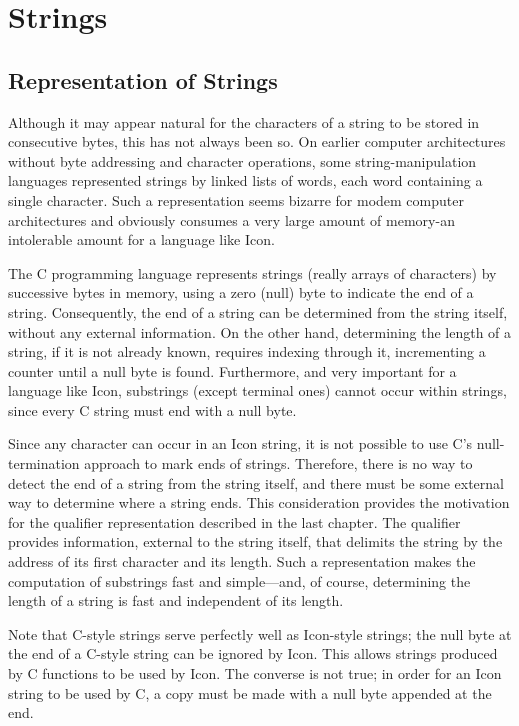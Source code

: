 \section{Strings}
\subsection{Representation of Strings}

Although it may appear natural for the characters of a string to be
stored in consecutive bytes, this has not always been so. On earlier
computer architectures without byte addressing and character
operations, some string-manipulation languages represented strings by
linked lists of words, each word containing a single character. Such a
representation seems bizarre for modem computer architectures and
obviously consumes a very large amount of memory-an intolerable amount
for a language like Icon.

The C programming language represents strings (really arrays of
characters) by successive bytes in memory, using a zero (null) byte to
indicate the end of a string. Consequently, the end of a string can be
determined from the string itself, without any external
information. On the other hand, determining the length of a string, if
it is not already known, requires indexing through it, incrementing a
counter until a null byte is found. Furthermore, and very important
for a language like Icon, substrings (except terminal ones) cannot
occur within strings, since every C string must end with a null byte.

Since any character can occur in an Icon string, it is not possible to
use C's null-termination approach to mark ends of strings. Therefore,
there is no way to detect the end of a string from the string itself,
and there must be some external way to determine where a string
ends. This consideration provides the motivation for the qualifier
representation described in the last chapter. The qualifier provides
information, external to the string itself, that delimits the string
by the address of its first character and its length. Such a
representation makes the computation of substrings fast and
simple---and, of course, determining the length of a string is
fast and independent of its length.

Note that C-style strings serve perfectly well as Icon-style strings;
the null byte at the end of a C-style string can be ignored by
Icon. This allows strings produced by C functions to be used by
Icon. The converse is not true; in order for an Icon string to be used
by C, a copy must be made with a null byte appended at the end.

